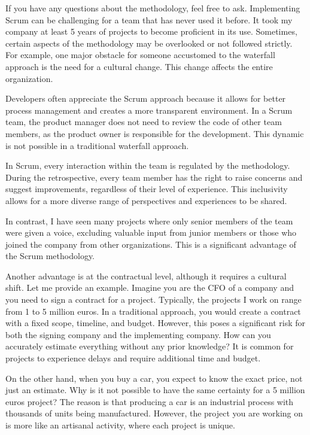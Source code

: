 If you have any questions about the methodology, feel free to ask.
Implementing Scrum can be challenging for a team that has never used it
before. It took my company at least 5 years of projects to become
proficient in its use. Sometimes, certain aspects of the methodology may
be overlooked or not followed strictly. For example, one major obstacle
for someone accustomed to the waterfall approach is the need for a
cultural change. This change affects the entire organization.

Developers often appreciate the Scrum approach because it allows for
better process management and creates a more transparent environment. In
a Scrum team, the product manager does not need to review the code of
other team members, as the product owner is responsible for the
development. This dynamic is not possible in a traditional waterfall
approach.

In Scrum, every interaction within the team is regulated by the
methodology. During the retrospective, every team member has the right
to raise concerns and suggest improvements, regardless of their level of
experience. This inclusivity allows for a more diverse range of
perspectives and experiences to be shared.

In contrast, I have seen many projects where only senior members of the
team were given a voice, excluding valuable input from junior members or
those who joined the company from other organizations. This is a
significant advantage of the Scrum methodology.

Another advantage is at the contractual level, although it requires a
cultural shift. Let me provide an example. Imagine you are the CFO of a
company and you need to sign a contract for a project. Typically, the
projects I work on range from 1 to 5 million euros. In a traditional
approach, you would create a contract with a fixed scope, timeline, and
budget. However, this poses a significant risk for both the signing
company and the implementing company. How can you accurately estimate
everything without any prior knowledge? It is common for projects to
experience delays and require additional time and budget.

On the other hand, when you buy a car, you expect to know the exact
price, not just an estimate. Why is it not possible to have the same
certainty for a 5 million euros project? The reason is that producing a
car is an industrial process with thousands of units being manufactured.
However, the project you are working on is more like an artisanal
activity, where each project is unique.

